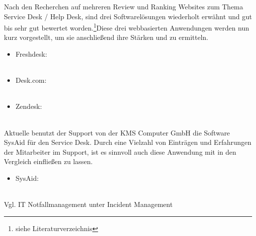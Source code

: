 
\noindent
Nach den Recherchen auf mehreren Review und Ranking Websites zum Thema Service Desk / Help Desk, sind drei Softwarelösungen wiederholt erwähnt und gut bis sehr gut bewertet worden.\footnote{siehe Literaturverzeichnis}Diese drei webbasierten Anwendungen werden nun kurz vorgestellt, um sie anschließend ihre Stärken und zu ermitteln.

\begin{itemize}
\item Freshdesk:\\
		\\
		 
\item Desk.com:\\
		\\
		
\item Zendesk:\\
		\\		
\end{itemize}

\noindent
Aktuelle benutzt der Support von der KMS Computer GmbH die Software SysAid für den Service Desk. Durch eine Vielzahl von Einträgen und Erfahrungen der Mitarbeiter im Support, ist es sinnvoll auch diese Anwendung mit in den Vergleich einfließen zu lassen.

\begin{itemize}
\item SysAid:\\
		\\
\end{itemize}	


\noindent
Vgl. IT Notfallmanagement unter Incident Management